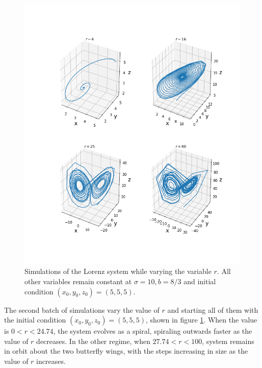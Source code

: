 \documentclass[twocolumn]{article}
\begin{document}
\begin{figure}
  \includegraphics[width=\linewidth]{sims2.png}
  \caption{
    Simulations of the Lorenz system while varying the variable $r$. All other
    variables remain constant at $\sigma=10, b=8/3$ and initial condition $(x_0,
    y_0, z_0) = (5, 5, 5)$.
  }
  \label{fig:sims_vary_r}
\end{figure}

The second batch of simulations vary the value of $r$ and starting all of them
with the initial condition $(x_0, y_0, z_0) = (5, 5, 5)$, shown in figure
\ref{fig:sims_vary_r}. When the value is $0 < r < 24.74$, the system evolves as
a spiral, spiraling outwards faster as the value of $r$ decreases. In the other
regime, when $27.74 < r < 100$, system remains in orbit about the two butterfly
wings, with the steps increasing in size as the value of $r$ increases.
\end{document}
